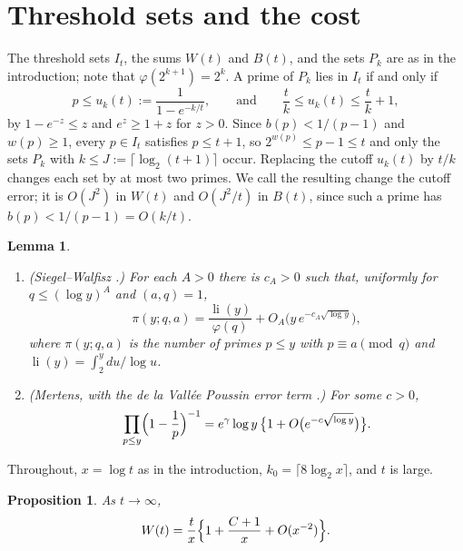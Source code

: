 \documentclass[11pt]{amsart}
\newtheorem{lemma}[theorem]{Lemma}
\newtheorem{proposition}[theorem]{Proposition}
\theoremstyle{remark}
\numberwithin{equation}{section}
\DeclareMathOperator{\li}{li}
\begin{document}
\section{Threshold sets and the cost}\label{sec:cost}

The threshold sets $I_t$, the sums $W(t)$ and $B(t)$, and the sets
$P_k$ are as in the introduction; note that $\varphi(2^{k+1})=2^k$. A
prime of $P_k$ lies in $I_t$ if and only if
\begin{equation}\label{eq:cutoff}
p\le u_k(t):=\frac{1}{1-e^{-k/t}},\qquad\text{and}\qquad
\frac tk\le u_k(t)\le\frac tk+1,
\end{equation}
by $1-e^{-z}\le z$ and $e^{z}\ge1+z$ for $z>0$. Since
$b(p)<1/(p-1)$ and $w(p)\ge1$, every $p\in I_t$ satisfies $p\le t+1$, so
$2^{w(p)}\le p-1\le t$ and only the sets $P_k$ with $k\le J:=\lceil\log_2(t+1)\rceil$
occur. Replacing the cutoff $u_k(t)$ by $t/k$ changes each set by at
most two primes. We call the resulting change the cutoff error; it is
$O(J^2)$ in $W(t)$ and $O(J^2/t)$ in $B(t)$, since such a prime has
$b(p)<1/(p-1)=O(k/t)$.

\begin{lemma}\label{lem:inputs}
\begin{enumerate}
\item[(i)] \emph{(Siegel--Walfisz \cite[Theorem~12.1]{Kou}.)} For each $A>0$ there is $c_A>0$ such
that, uniformly for $q\le(\log y)^A$ and $(a,q)=1$,
\[
\pi(y;q,a)=\frac{\li(y)}{\varphi(q)}+O_A\bigl(y\,e^{-c_A\sqrt{\log y}}\bigr),
\]
where $\pi(y;q,a)$ is the number of primes $p\le y$ with $p\equiv a\pmod q$
and $\li(y)=\int_2^y du/\log u$.
\item[(ii)] \emph{(Mertens, with the de la Vall\'ee Poussin error term \cite[Lemma~8]{Ju23}.)}
For some $c>0$,
\[
\prod_{p\le y}\Bigl(1-\frac1p\Bigr)^{-1}
=e^\gamma\log y\,\bigl\{1+O\bigl(e^{-c\sqrt{\log y}}\bigr)\bigr\}.
\]
\end{enumerate}
\end{lemma}

Throughout, $x=\log t$ as in the introduction, $k_0=\lceil8\log_2x\rceil$, and $t$ is large.

\begin{proposition}\label{prop:cost}
As $t\to\infty$,
\[
W(t)=\frac tx\Bigl\{1+\frac{C+1}{x}+O(x^{-2})\Bigr\}.
\]
\end{proposition}
\end{document}
